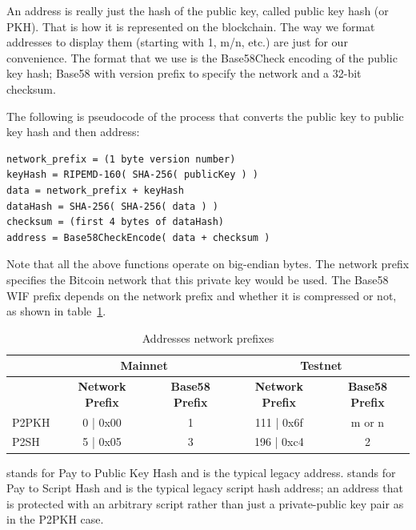 An address is really just the hash of the public key, called public key hash (or PKH). That is how it is represented on the blockchain. The way we format addresses to display them (starting with 1, m/n, etc.) are just for our convenience. The format that we use is the Base58Check encoding of the public key hash; Base58 with version prefix to specify the network and a 32-bit checksum.

The following is pseudocode of the process that converts the public key to public key hash and then address:

\begin{emphbox}
\begin{lstlisting}
network_prefix = (1 byte version number)
keyHash = RIPEMD-160( SHA-256( publicKey ) )
data = network_prefix + keyHash
dataHash = SHA-256( SHA-256( data ) )
checksum = (first 4 bytes of dataHash)
address = Base58CheckEncode( data + checksum )
\end{lstlisting}
\end{emphbox}

Note that all the above functions operate on big-endian bytes. The network prefix specifies the Bitcoin network that this private key would be used. The Base58 WIF prefix depends on the network prefix and whether it is compressed or not, as shown in table~\ref{tab:address-prefixes}.

\begin{table}[h]
\centering
\begin{tabular}{ |l|c|c|c|c| }
\hline
~ & \multicolumn{2}{c|}{\textbf{Mainnet}} & \multicolumn{2}{c|}{\textbf{Testnet}} \\
\hline
~ & \textbf{Network Prefix} & \textbf{Base58 Prefix} & \textbf{Network Prefix} & \textbf{Base58 Prefix} \\
\hline
P2PKH & 0 | 0x00 & 1 & 111 | 0x6f & m or n \\
\hline
P2SH & 5 | 0x05 & 3 & 196 | 0xc4 & 2 \\
\hline
\end{tabular}
\caption{Addresses network prefixes}
\label{tab:address-prefixes}
\end{table}

 stands for Pay to Public Key Hash and is the typical legacy address.  stands for Pay to Script Hash and is the typical legacy script hash address; an address that is protected with an arbitrary script rather than just a private-public key pair as in the P2PKH case.

